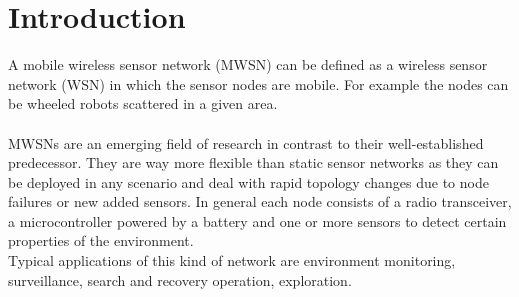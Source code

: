 \documentclass[a4paper,11pt,oneside]{book}
\begin{document}
	\chapter*{Introduction}
	A mobile wireless sensor network (MWSN) can be defined as a wireless sensor network (WSN) in which the sensor nodes are mobile. For example the nodes can be wheeled robots scattered in a given area.\\\\
	MWSNs are an emerging field of research in contrast to their well-established predecessor. They are way more flexible than static sensor networks as they can be deployed in any scenario and deal with rapid topology changes due to node failures or new added sensors. In general each node consists of a radio transceiver, a microcontroller powered by a battery and one or more sensors to detect certain properties of the environment.~\cite{K2}\\ 
	Typical applications of this kind of network are environment monitoring, surveillance, search and recovery operation, exploration.\\
	
\end{document}
